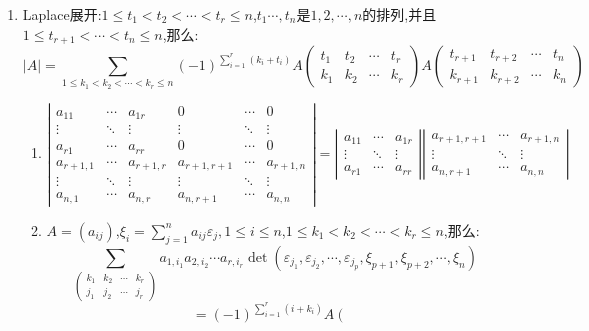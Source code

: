 \begin{enumerate}
	\item Laplace展开:$1\le t_1<t_2<\cdots<t_r\le n$,$t_1\cdots,t_n$是$1,2,\cdots,n$的排列,并且
	$1\le t_{r+1}<\cdots<t_n\le n$,那么:
	$$|A|=\sum_{1\le k_1<k_2<\cdots<k_r\le n}(-1)^{\sum_{i=1}^r(k_i+t_i)}A
	\left(
	\begin{array}{cccc}
	t_1&t_2&\cdots&t_r\\
	k_1&k_2&\cdots&k_r
	\end{array}\right)A\left(\begin{array}{cccc}
	t_{r+1}&t_{r+2}&\cdots&t_n\\
	k_{r+1}&k_{r+2}&\cdots&k_n
	\end{array}\right)$$
	\begin{enumerate}
		\item
		$$\left|\begin{array}{cccccc}
		a_{11}&\cdots&a_{1r}&0&\cdots&0\\
		\vdots&\ddots&\vdots&\vdots&\ddots&\vdots\\
		a_{r1}&\cdots&a_{rr}&0&\cdots&0\\
		a_{r+1,1}&\cdots&a_{r+1,r}&a_{r+1,r+1}&\cdots&a_{r+1,n}\\
		\vdots&\ddots&\vdots&\vdots&\ddots&\vdots\\
		a_{n,1}&\cdots&a_{n,r}&a_{n,r+1}&\cdots&a_{n,n}
		\end{array}\right|=
		\left|\begin{array}{ccc}
		a_{11}&\cdots&a_{1r}\\
		\vdots&\ddots&\vdots\\
		a_{r1}&\cdots&a_{rr}
		\end{array}\right|\left|\begin{array}{ccc}
		a_{r+1,r+1}&\cdots&a_{r+1,n}\\
		\vdots&\ddots&\vdots\\
		a_{n,r+1}&\cdots&a_{n,n}
		\end{array}\right|
		$$
		\item $A=(a_{ij})$,$\xi_i=\sum_{j=1}^na_{ij}\varepsilon_j,1\le i\le n$,$1\le k_1<k_2<\cdots<k_r\le n$,那么:
		$$\sum_{\left(
			\begin{array}{cccc}
			k_1&k_2&\cdots&k_r\\
			j_1&j_2&\cdots&j_r
			\end{array}\right)}a_{1,i_1}a_{2,i_2}\cdots a_{r,i_r}\det(\varepsilon_{j_1},\varepsilon_{j_2},\cdots,\varepsilon_{j_p},\xi_{p+1},\xi_{p+2},\cdots,\xi_n)
		$$
		$$=(-1)^{\sum_{i=1}^r(i+k_i)}A\left(
		\begin{array}{cccc}

\end{array}$$
\end{enumerate}
\end{enumerate}
